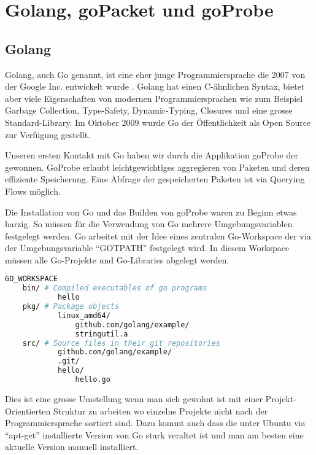 \section{Golang, goPacket und goProbe}
\label{sec:Golang, goPacket und goProbe}

\subsection{Golang}
Golang, auch Go genannt, ist eine eher junge Programmiersprache die 2007 von der Google Inc. entwickelt wurde \cite[:10]{techcrunch_golang}. Golang hat einen C-ähnlichen Syntax, bietet aber viele Eigenschaften von modernen Programmiersprachen wie zum Beispiel Garbage Collection, Type-Safety, Dynamic-Typing, Closures und eine grosse Standard-Library.\cite[:1-30]{effective_go}
Im Oktober 2009 wurde Go der Öffentlichkeit als Open Source zur Verfügung gestellt.

Unseren ersten Kontakt mit Go haben wir durch die Applikation goProbe der \osag gewonnen.
GoProbe erlaubt leichtgewichtiges aggregieren von Paketen und deren effiziente Speicherung. Eine Abfrage der gespeicherten Paketen ist via Querying Flows möglich.

Die Installation von Go und das Builden von goProbe waren zu Beginn etwas harzig. So müssen für die Verwendung von Go mehrere Umgebungsvariablen festgelegt werden. Go arbeitet mit der Idee eines zentralen Go-Workspace der via der Umgebungsvariable \enquote{GOTPATH} festgelegt wird. In diesem Workspace müssen alle Go-Projekte und Go-Libraries abgelegt werden.

\begin{lstlisting}[language=bash, caption=Typische Go Workspace Struktur]
GO_WORKSPACE
	bin/ # Compiled executables of go programs
    		hello
	pkg/ # Package objects
    		linux_amd64/                     
        		github.com/golang/example/   
				stringutil.a	
	src/ # Source files in their git repositories                       
    		github.com/golang/example/       
			.git/
			hello/                       
				hello.go	
\end{lstlisting}

Dies ist eine grosse Umstellung wenn man sich gewohnt ist mit einer Projekt-Orientierten Struktur zu arbeiten wo einzelne Projekte nicht nach der Programmiersprache sortiert sind. Dazu kommt auch dass die unter Ubuntu via \enquote{apt-get} installierte Version von Go stark veraltet ist und man am besten eine aktuelle Version manuell installiert.

